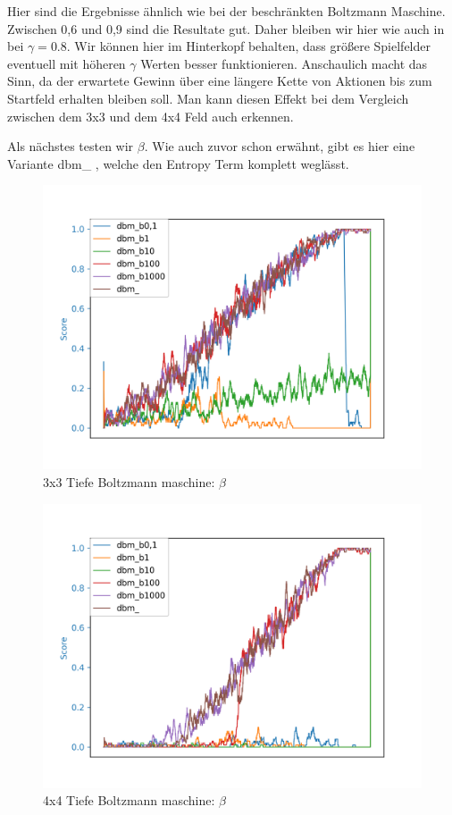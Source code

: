 Hier sind die Ergebnisse ähnlich wie bei der beschränkten Boltzmann Maschine. Zwischen 0,6 und 0,9 sind die Resultate gut. Daher bleiben wir hier wie auch in \citep{crawford2019reinforcement} bei $\gamma = 0.8$. Wir können hier im Hinterkopf behalten, dass größere Spielfelder eventuell mit höheren $\gamma$ Werten besser funktionieren. Anschaulich macht das Sinn, da der erwartete Gewinn über eine längere Kette von Aktionen bis zum Startfeld erhalten bleiben soll. Man kann diesen Effekt bei dem Vergleich zwischen dem 3x3 und dem 4x4 Feld auch erkennen.

Als nächstes testen wir $\beta$. Wie auch zuvor schon erwähnt, gibt es hier eine Variante dbm\_ , welche den Entropy Term komplett weglässt.

\begin{figure}[H]
\centering
\includegraphics[width=\textwidth]{Figures/dbm2_3x3_dbm_b0,1_dbm_b1_dbm_b10_dbm_b100_dbm_b1000_dbm_.png}
\caption{3x3 Tiefe Boltzmann maschine: $\beta$}
\label{dbm1}
\end{figure}

\begin{figure}[H]
\centering
\includegraphics[width=\textwidth]{Figures/dbm3_4x4_dbm_b0,1_dbm_b1_dbm_b10_dbm_b100_dbm_b1000_dbm_.png}
\caption{4x4 Tiefe Boltzmann maschine: $\beta$}
\label{dbm1}
\end{figure}

